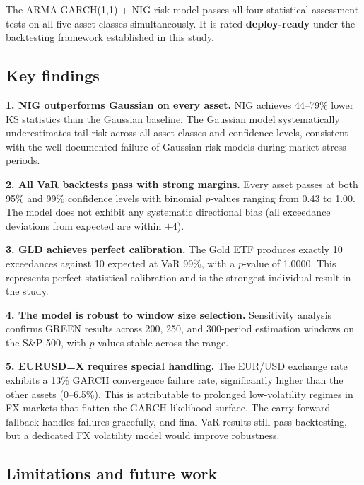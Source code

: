 \documentclass[12pt, a4paper]{article}
\begin{document}
The ARMA-GARCH(1,1) + NIG risk model passes all four statistical 
assessment tests on all five asset classes simultaneously. It is 
rated \textbf{deploy-ready} under the backtesting framework 
established in this study.

\subsection{Key findings}

\textbf{1. NIG outperforms Gaussian on every asset.}
NIG achieves 44--79\% lower KS statistics than the Gaussian 
baseline. The Gaussian model systematically underestimates tail 
risk across all asset classes and confidence levels, consistent 
with the well-documented failure of Gaussian risk models during 
market stress periods.

\textbf{2. All VaR backtests pass with strong margins.}
Every asset passes at both 95\% and 99\% confidence levels with 
binomial $p$-values ranging from 0.43 to 1.00. The model does 
not exhibit any systematic directional bias (all exceedance 
deviations from expected are within $\pm$4).

\textbf{3. GLD achieves perfect calibration.}
The Gold ETF produces exactly 10 exceedances against 10 expected 
at VaR 99\%, with a $p$-value of 1.0000. This represents perfect 
statistical calibration and is the strongest individual result 
in the study.

\textbf{4. The model is robust to window size selection.}
Sensitivity analysis confirms GREEN results across 200, 250, and 
300-period estimation windows on the S\&P 500, with $p$-values 
stable across the range.

\textbf{5. EURUSD=X requires special handling.}
The EUR/USD exchange rate exhibits a 13\% GARCH convergence 
failure rate, significantly higher than the other assets 
(0--6.5\%). This is attributable to prolonged low-volatility 
regimes in FX markets that flatten the GARCH likelihood surface. 
The carry-forward fallback handles failures gracefully, and final 
VaR results still pass backtesting, but a dedicated FX volatility 
model would improve robustness.

\subsection{Limitations and future work}
\end{document}
